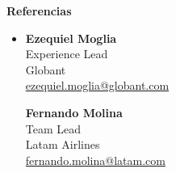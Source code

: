 \documentclass[letterpaper,11pt]{article}
\newcommand{\resheading}[1]{{\large \colorbox{mygrey}{\begin{minipage}{\textwidth}{\textbf{#1 \vphantom{p\^{E}}}}\end{minipage}}}}
\begin{document}
    \resheading{Referencias}
        \begin{itemize}
            \item[]
                \begin{minipage}[t]{0.45\textwidth}
                    \textbf{Ezequiel Moglia}\\
                    Experience Lead\\
                    Globant\\
                    \href{mailto:ezequiel.moglia@globant.com}{ezequiel.moglia@globant.com}
                \end{minipage}
                \hfill
                \begin{minipage}[t]{0.45\textwidth}
                    \textbf{Fernando Molina}\\
                    Team Lead\\
                    Latam Airlines\\
                    \href{mailto:fernando.molina@latam.com}{fernando.molina@latam.com}
                \end{minipage}
        \end{itemize}

    
\end{document}

